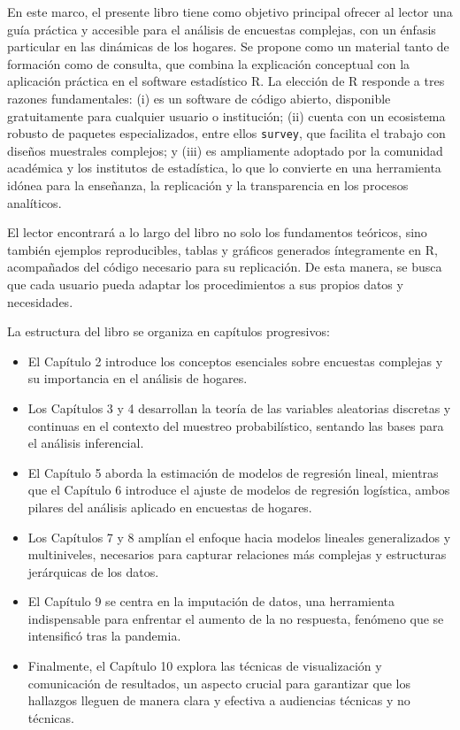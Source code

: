 \documentclass[
  spanish,
  12pt,
]{book}
\providecommand{\tightlist}{%
  \setlength{\itemsep}{0pt}\setlength{\parskip}{0pt}}
\begin{document}
En este marco, el presente libro tiene como objetivo principal ofrecer al lector una guía práctica y accesible para el análisis de encuestas complejas, con un énfasis particular en las dinámicas de los hogares. Se propone como un material tanto de formación como de consulta, que combina la explicación conceptual con la aplicación práctica en el software estadístico R. La elección de R responde a tres razones fundamentales: (i) es un software de código abierto, disponible gratuitamente para cualquier usuario o institución; (ii) cuenta con un ecosistema robusto de paquetes especializados, entre ellos \texttt{survey}, que facilita el trabajo con diseños muestrales complejos; y (iii) es ampliamente adoptado por la comunidad académica y los institutos de estadística, lo que lo convierte en una herramienta idónea para la enseñanza, la replicación y la transparencia en los procesos analíticos.

El lector encontrará a lo largo del libro no solo los fundamentos teóricos, sino también ejemplos reproducibles, tablas y gráficos generados íntegramente en R, acompañados del código necesario para su replicación. De esta manera, se busca que cada usuario pueda adaptar los procedimientos a sus propios datos y necesidades.

La estructura del libro se organiza en capítulos progresivos:

\begin{itemize}
\tightlist
\item
  El Capítulo 2 introduce los conceptos esenciales sobre encuestas complejas y su importancia en el análisis de hogares.
\item
  Los Capítulos 3 y 4 desarrollan la teoría de las variables aleatorias discretas y continuas en el contexto del muestreo probabilístico, sentando las bases para el análisis inferencial.
\item
  El Capítulo 5 aborda la estimación de modelos de regresión lineal, mientras que el Capítulo 6 introduce el ajuste de modelos de regresión logística, ambos pilares del análisis aplicado en encuestas de hogares.
\item
  Los Capítulos 7 y 8 amplían el enfoque hacia modelos lineales generalizados y multiniveles, necesarios para capturar relaciones más complejas y estructuras jerárquicas de los datos.
\item
  El Capítulo 9 se centra en la imputación de datos, una herramienta indispensable para enfrentar el aumento de la no respuesta, fenómeno que se intensificó tras la pandemia.
\item
  Finalmente, el Capítulo 10 explora las técnicas de visualización y comunicación de resultados, un aspecto crucial para garantizar que los hallazgos lleguen de manera clara y efectiva a audiencias técnicas y no técnicas.
\end{itemize}
\end{document}
